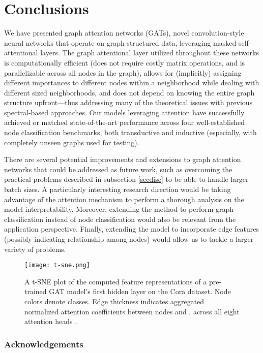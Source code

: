 \documentclass{article} \usepackage{iclr2018_conference,times}
\begin{document}
\section{Conclusions}
We have presented graph attention networks (GATs), novel convolution-style neural networks that operate on graph-structured data, leveraging masked self-attentional layers. The graph attentional layer utilized throughout these networks is computationally efficient (does not require costly matrix operations, and is parallelizable across all nodes in the graph), allows for (implicitly) assigning different importances to different nodes within a neighborhood while dealing with different sized neighborhoods, and does not depend on knowing the entire graph structure upfront---thus addressing many of the theoretical issues with previous spectral-based approaches. Our models leveraging attention have successfully achieved or matched state-of-the-art performance across four well-established node classification benchmarks, both transductive and inductive (especially, with completely unseen graphs used for testing).

There are several potential improvements and extensions to graph attention networks that could be addressed as future work, such as overcoming the practical problems described in subsection \ref{secdisc} to be able to handle larger batch sizes. A particularly interesting research direction would be taking advantage of the attention mechanism to perform a thorough analysis on the model interpretability. Moreover, extending the method to perform graph classification instead of node classification would also be relevant from the application perspective. Finally, extending the model to incorporate edge features (possibly indicating relationship among nodes) would allow us to tackle a larger variety of problems.

\begin{figure}[h!]
\begin{center}
	\texttt{[image: t-sne.png]}
\end{center}
\caption{A t-SNE plot of the computed feature representations of a pre-trained GAT model's first hidden layer on the Cora dataset. Node colors denote classes. Edge thickness indicates aggregated normalized attention coefficients between nodes  and , across all eight attention heads .}
\label{tsneee}
\end{figure}


\subsubsection*{Acknowledgements}
\end{document}
